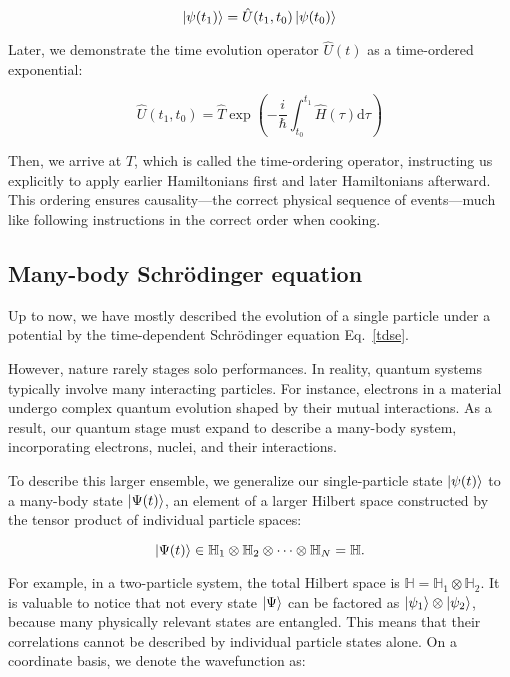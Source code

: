 \begin{equation}
    \ket{\psi(t_1)}=\hat{U}(t_1,t_0)\ket{\psi(t_0)}
    \label{given_evolution}
\end{equation}

Later, we demonstrate the time evolution operator $\hat{U}(t)$ as a time-ordered exponential:

\begin{equation}
    \hat{U}(t_1,t_0) = \hat{T}\exp\left({-\frac{i}{\hbar}\int_{t_0}^{t_1}\hat{H}(\tau)\mathrm{d}{\tau}}\right)
    \label{time-ordering_operator}
\end{equation}

Then, we arrive at $\hat{T}$, which is called the time-ordering operator, instructing us explicitly to apply earlier Hamiltonians first and later Hamiltonians afterward. This ordering ensures causality—the correct physical sequence of events—much like following instructions in the correct order when cooking.

\subsection{Many-body Schrödinger equation}

Up to now, we have mostly described the evolution of a single particle under a potential by the time-dependent Schrödinger equation Eq.~\eqref{tdse}. 

However, nature rarely stages solo performances. In reality, quantum systems typically involve many interacting particles. For instance, electrons in a material undergo complex quantum evolution shaped by their mutual interactions. As a result, our quantum stage must expand to describe a many-body system, incorporating electrons, nuclei, and their interactions.

To describe this larger ensemble, we generalize our single-particle state $\ket{\psi(t)}$ to a many-body state $\ket{\Psi(t)}$, an element of a larger Hilbert space constructed by the tensor product of individual particle spaces:

\begin{equation}
    \ket{\Psi(t)}\in \mathbb{H}_1\otimes\mathbb{H}_2\otimes \cdots\otimes\mathbb{H}_N=\mathbb{H}.
    \label{many-body_state_vector}
\end{equation}

For example, in a two-particle system, the total Hilbert space is $\mathbb{H}=\mathbb{H}_1\otimes\mathbb{H}_2$. It is valuable to notice that not every state $\ket{\Psi}$ can be factored as 
$\ket{\psi_1} \otimes \ket{\psi_2}$, because many physically relevant states are entangled. This means that their correlations cannot be described by individual particle states alone. On a coordinate basis, we denote the wavefunction as:

